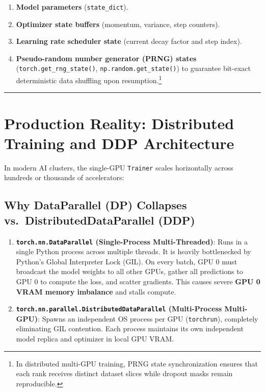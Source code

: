 \documentclass[
  letterpaper,
]{scrbook}
\providecommand{\tightlist}{%
  \setlength{\itemsep}{0pt}\setlength{\parskip}{0pt}}
\begin{document}
\begin{enumerate}
\def\labelenumi{\arabic{enumi}.}
\tightlist
\item
  \textbf{Model parameters} (\texttt{state\_dict}).
\item
  \textbf{Optimizer state buffers} (momentum, variance, step counters).
\item
  \textbf{Learning rate scheduler state} (current decay factor and step
  index).
\item
  \textbf{Pseudo-random number generator (PRNG) states}
  (\texttt{torch.get\_rng\_state()}, \texttt{np.random.get\_state()}) to
  guarantee bit-exact deterministic data shuffling upon
  resumption.\footnote{In distributed multi-GPU training, PRNG state
    synchronization ensures that each rank receives distinct dataset
    slices while dropout masks remain reproducible.}
\end{enumerate}

\begin{center}\rule{0.5\linewidth}{0.5pt}\end{center}

\section{Production Reality: Distributed Training and DDP
Architecture}\label{production-reality-distributed-training-and-ddp-architecture}

In modern AI clusters, the single-GPU \texttt{Trainer} scales
horizontally across hundreds or thousands of accelerators:

\subsection{Why DataParallel (DP) Collapses vs.~DistributedDataParallel
(DDP)}\label{why-dataparallel-dp-collapses-vs.-distributeddataparallel-ddp}

\begin{enumerate}
\def\labelenumi{\arabic{enumi}.}
\item
  \textbf{\texttt{torch.nn.DataParallel} (Single-Process
  Multi-Threaded)}: Runs in a single Python process across multiple
  threads. It is heavily bottlenecked by Python's Global Interpreter
  Lock (GIL). On every batch, GPU 0 must broadcast the model weights to
  all other GPUs, gather all predictions to GPU 0 to compute the loss,
  and scatter gradients. This causes severe \textbf{GPU 0 VRAM memory
  imbalance} and stalls compute.
\item
  \textbf{\texttt{torch.nn.parallel.DistributedDataParallel}
  (Multi-Process Multi-GPU)}: Spawns an independent OS process per GPU
  (\texttt{torchrun}), completely eliminating GIL contention. Each
  process maintains its own independent model replica and optimizer in
  local GPU VRAM.
\end{enumerate}
\end{document}
